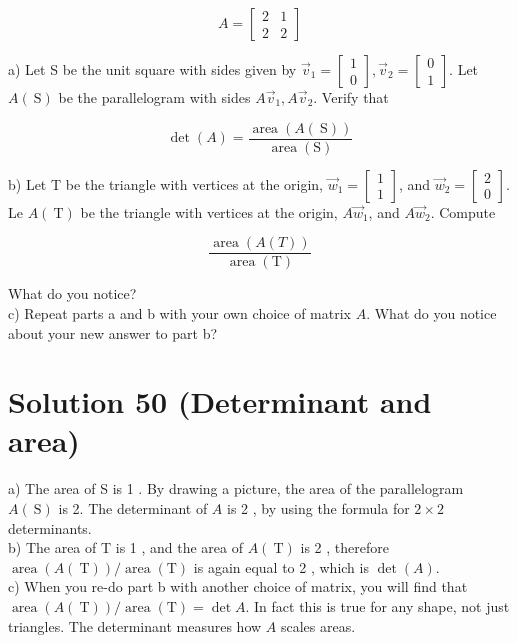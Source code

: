 \documentclass[10pt]{article}
\begin{document}
$$
A=\left[\begin{array}{ll}
2 & 1 \\
2 & 2
\end{array}\right]
$$

a) Let S be the unit square with sides given by $\vec{v}_{1}=\left[\begin{array}{l}1 \\ 0\end{array}\right], \vec{v}_{2}=\left[\begin{array}{l}0 \\ 1\end{array}\right]$. Let $A(\mathrm{~S})$ be the parallelogram with sides $A \vec{v}_{1}, A \vec{v}_{2}$. Verify that

$$
\operatorname{det}(A)=\frac{\operatorname{area}(A(\mathrm{~S}))}{\operatorname{area}(\mathrm{S})}
$$

b) Let T be the triangle with vertices at the origin, $\vec{w}_{1}=\left[\begin{array}{l}1 \\ 1\end{array}\right]$, and $\vec{w}_{2}=\left[\begin{array}{l}2 \\ 0\end{array}\right]$. Le $A(\mathrm{~T})$ be the triangle with vertices at the origin, $A \vec{w}_{1}$, and $A \vec{w}_{2}$. Compute

$$
\frac{\operatorname{area}(A(T))}{\operatorname{area}(\mathrm{T})}
$$

What do you notice?\\
c) Repeat parts a and b with your own choice of matrix $A$. What do you notice about your new answer to part b?

\section*{Solution 50 (Determinant and area)}
a) The area of S is 1 . By drawing a picture, the area of the parallelogram $A(\mathrm{~S})$ is 2. The determinant of $A$ is 2 , by using the formula for $2 \times 2$ determinants.\\
b) The area of T is 1 , and the area of $A(\mathrm{~T})$ is 2 , therefore $\operatorname{area}(A(\mathrm{~T})) / \operatorname{area}(\mathrm{T})$ is again equal to 2 , which is $\operatorname{det}(A)$.\\
c) When you re-do part b with another choice of matrix, you will find that $\operatorname{area}(A(\mathrm{~T})) / \operatorname{area}(\mathrm{T})=\operatorname{det} A$. In fact this is true for any shape, not just triangles. The determinant measures how $A$ scales areas.
\end{document}
